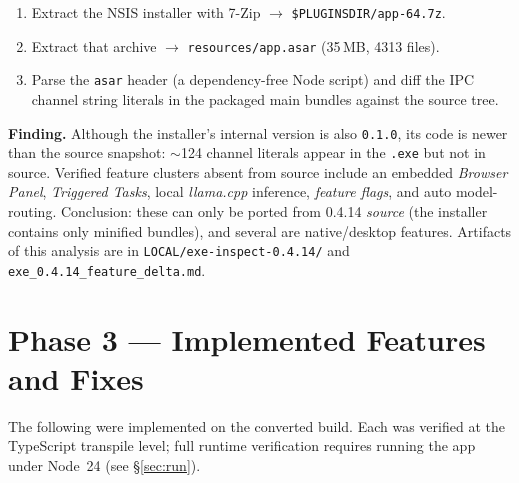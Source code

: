 \documentclass[11pt,a4paper]{article}
\begin{document}
\begin{enumerate}[leftmargin=1.4em,topsep=2pt]
  \item Extract the NSIS installer with 7-Zip $\rightarrow$
        \verb|$PLUGINSDIR/app-64.7z|.
  \item Extract that archive $\rightarrow$ \verb|resources/app.asar| (35\,MB,
        4313 files).
  \item Parse the \verb|asar| header (a dependency-free Node script) and diff the
        IPC channel string literals in the packaged main bundles against the
        source tree.
\end{enumerate}

\textbf{Finding.} Although the installer's internal version is also \texttt{0.1.0},
its code is newer than the source snapshot: $\sim$124 channel literals appear in
the \texttt{.exe} but not in source. Verified feature clusters absent from source
include an embedded \emph{Browser Panel}, \emph{Triggered Tasks}, local
\emph{llama.cpp} inference, \emph{feature flags}, and auto model-routing.
Conclusion: these can only be ported from 0.4.14 \emph{source} (the installer
contains only minified bundles), and several are native/desktop features.
Artifacts of this analysis are in \verb|LOCAL/exe-inspect-0.4.14/| and
\verb|exe_0.4.14_feature_delta.md|.

\section{Phase 3 --- Implemented Features and Fixes}
The following were implemented on the converted build. Each was verified at the
TypeScript transpile level; full runtime verification requires running the app
under Node~24 (see \S\ref{sec:run}).
\end{document}
